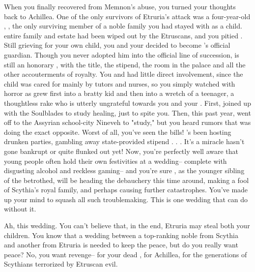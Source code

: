 \documentclass[char]{Kos}
\begin{document}
When you finally recovered from Memnon's abuse, you turned your thoughts back to Achillea. One of the only survivors of Etruria's attack was a four-year-old \cWard{\kid}, \cWard{\name}, the only surviving member of a noble family you had stayed with as a child. \cWard{\Their} entire family and estate had been wiped out by the Etruscans, and you pitied \cWard{\them}. Still grieving for your own child, you and your \cScythiaKing{\spouse} decided to become \cWard{\nickname}'s official guardian. Though you never adopted him into the official line of succession, \cWard{\they} is still an honorary \cWard{\prince}, with the title, the stipend, the room in the palace and all the other accouterments of royalty. You and \cScythiaKing{\nickname} had little direct involvement, since the child was cared for mainly by tutors and nurses, so you simply watched with horror as \cWard{\nickname} grew first into a bratty kid and then into a wretch of a teenager, a thoughtless rake who is utterly ungrateful towards you and your \cScythiaKing{\spouse}. First, \cWard{\they} joined up with the Soulblades to study healing, just to spite you. Then, this past year, \cWard{\they} went off to the Assyrian school-city Nineveh to "study," but you heard rumors that \cWard{\they} was doing the exact opposite. Worst of all, you've seen the bills! \cWard{\They}'s been hosting drunken parties, gambling away \cWard{\their} state-provided stipend . . . It's a miracle \cWard{\they} hasn't gone bankrupt or quite flunked out yet! Now, you're perfectly well aware that young people often hold their own festivities at a wedding-- complete with disgusting alcohol and reckless gaming-- and you're sure \cWard{\nickname}, as the younger sibling of the betrothed, will be heading the debauchery this time around, making a fool of Scythia's royal family, and perhaps causing further catastrophes. You've made up your mind to squash all such troublemaking. This is one wedding that can do without it.

Ah, this wedding. You can't believe that, in the end, Etruria may steal both your children. You know that a wedding between a top-ranking noble from Scythia and another from Etruria is needed to keep the peace, but do you really want peace? No, you want revenge-- for your dead \cFugitive{\child}, for Achillea, for the generations of Scythians terrorized by Etruscan evil. 
\end{document}
